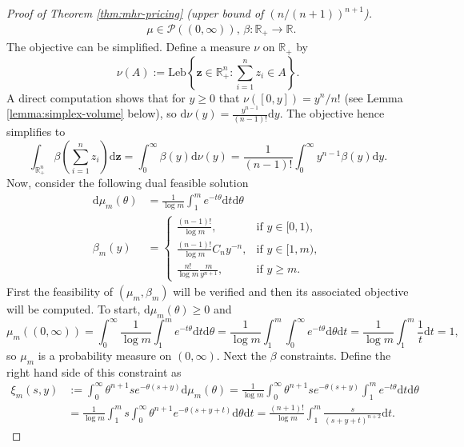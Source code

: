 \documentclass[11pt]{article}
\newcommand{\dd}{\mathrm{d}}
\begin{document}
\begin{proof}[Proof of Theorem \ref{thm:mhr-pricing} (upper bound of $(n/(n+1))^{n+1}$)]
\begin{align*}
        &&& \mu\in\mathcal{P}((0,\infty))\text{, }\beta:\mathbb{R}_+\to\mathbb{R}.
    \end{align*}
    The objective can be simplified.
    Define a measure $\nu$ on $\mathbb{R}_+$ by 
    $$
        \nu(A):=\mathrm{Leb}\left\{\boldsymbol{z}\in\mathbb{R}_+^n:\sum_{i=1}^nz_i\in A\right\}.
    $$
    A direct computation shows that for $y\ge 0$ that $\nu([0,y])=y^n/n!$ (see Lemma \ref{lemma:simplex-volume} below), so $\dd \nu(y)=\frac{y^{n-1}}{(n-1)!}\dd y$. The objective hence simplifies to
    \begin{equation}
        \label{eq:objective-expo-killing-dual}
        \int_{\mathbb{R}_+^n}\beta\left(\sum_{i=1}^nz_i\right)\dd \boldsymbol{z}=\int_0^\infty \beta(y)\dd \nu(y)=\frac{1}{(n-1)!}\int_0^\infty y^{n-1}\beta(y)\dd y.
    \end{equation}
    Now, consider the following dual feasible solution
    \begin{align}
        \label{eq:dual-solution-measure}
        \dd \mu_m(\theta)&=\frac{1}{\log m}\int_1^me^{-t\theta}\dd t\dd \theta\\
        \label{eq:dual-solution-constraint}
        \beta_m(y)&=\begin{cases}
            \frac{(n-1)!}{\log m},&\text{if }y\in[0,1),\\
            \frac{(n-1)!}{\log m}C_ny^{-n},&\text{if }y\in[1,m),\\
            \frac{n!}{\log m}\frac{m}{y^{n+1}},&\text{if }y\ge m.
        \end{cases}
    \end{align}
    First the feasibility of $(\mu_m,\beta_m)$ will be verified and then its associated objective will be computed. 
    To start, $\dd \mu_m(\theta)\ge 0$ and
    $$
        \mu_m((0,\infty))=\int_0^\infty\frac{1}{\log m}\int_1^me^{-t\theta}\dd t\dd \theta=\frac{1}{\log m}\int_1^m\int_0^\infty e^{-t\theta}\dd \theta\dd t=\frac{1}{\log m}\int_1^m\frac{1}{t}\dd t=1,
    $$
    so $\mu_m$ is a probability measure on $(0,\infty)$. Next the $\beta$ constraints. Define the right hand side of this constraint as
    \begin{align*}
        \xi_m(s,y)&:=\int_0^\infty \theta^{n+1}se^{-\theta(s+y)}\dd \mu_m(\theta)=\frac{1}{\log m}\int_0^\infty\theta^{n+1}se^{-\theta(s+y)} \int_1^me^{-t\theta}\dd t\dd \theta\\
        &=\frac{1}{\log m}\int_1^ms\int_0^\infty \theta^{n+1}e^{-\theta(s+y+t)}\dd \theta\dd t=\frac{(n+1)!}{\log m}\int_1^m\frac{s}{(s+y+t)^{n+2}}\dd t.
    \end{align*}

\end{proof}
\end{document}
